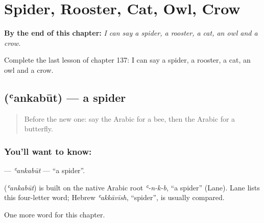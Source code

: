 
\chapter{Spider, Rooster, Cat, Owl, Crow}
\label{ch:ar-spider-rooster-cat-owl-crow}

\begin{chapteropening}
\textbf{By the end of this chapter:} \emph{I can say a spider, a rooster, a cat, an owl and a crow.}

Complete the last lesson of chapter 137: I can say a spider, a rooster, a cat, an owl and a crow.
\end{chapteropening}

\section[\texorpdfstring{\ar{عنكبوت} (ʿankabūt)}{عنكبوت (ʿankabūt)}]{ (ʿankabūt) — a spider}

\label{lesson:AR-C137-ankabut}



\begin{quote}
Before the new one: say the Arabic for a bee, then the Arabic for a butterfly.
\end{quote}

\subsection*{You'll want to know: }
\textbf{} — \emph{ʿankabūt} — \textquotedblleft{}a spider\textquotedblright{}.

\begin{cousinweb}
\textbf{} (\emph{ʿankabūt}) is built on the native Arabic root \emph{ʿ-n-k-b}, \textquotedblleft{}a spider\textquotedblright{} (Lane). Lane lists this four-letter word; Hebrew \emph{ʿakkāvīsh}, \textquotedblleft{}spider\textquotedblright{}, is usually compared.
\end{cousinweb}

\begin{grammarlens}[title={What you've built}]
One more word for this chapter.
\end{grammarlens}

